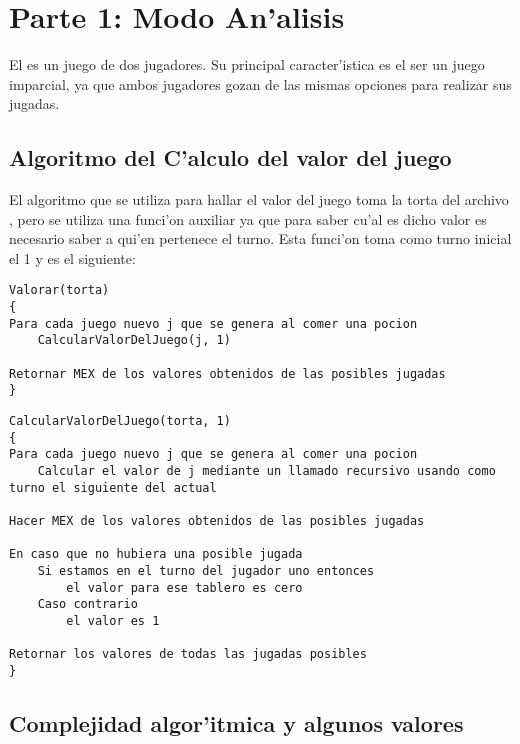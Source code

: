 \documentclass[spanish, a4paper, 10pt, titlepage]{article}
\author{Freijo - Giusto}
\begin{document}

\tableofcontents
\clearpage


\section{Parte 1: Modo An'alisis}

El  es un juego de dos jugadores. Su principal caracter'istica es el ser un juego imparcial, ya que ambos jugadores gozan de las mismas opciones para realizar sus jugadas.

\subsection{Algoritmo del C'alculo del valor del juego}
El algoritmo que se utiliza para hallar el valor del juego toma la torta del archivo , pero se utiliza una funci'on auxiliar ya que para saber cu'al es dicho valor es necesario saber a qui'en pertenece el turno. Esta funci'on toma como turno inicial el 1 y es el siguiente:

\begin{verbatim}
Valorar(torta)
{
Para cada juego nuevo j que se genera al comer una pocion
    CalcularValorDelJuego(j, 1)

Retornar MEX de los valores obtenidos de las posibles jugadas
}
\end{verbatim}



\begin{verbatim}
CalcularValorDelJuego(torta, 1)
{
Para cada juego nuevo j que se genera al comer una pocion
    Calcular el valor de j mediante un llamado recursivo usando como turno el siguiente del actual

Hacer MEX de los valores obtenidos de las posibles jugadas

En caso que no hubiera una posible jugada
    Si estamos en el turno del jugador uno entonces
        el valor para ese tablero es cero
    Caso contrario
        el valor es 1

Retornar los valores de todas las jugadas posibles
}
\end{verbatim}

\subsection{Complejidad algor'itmica y algunos valores}
\end{document}
